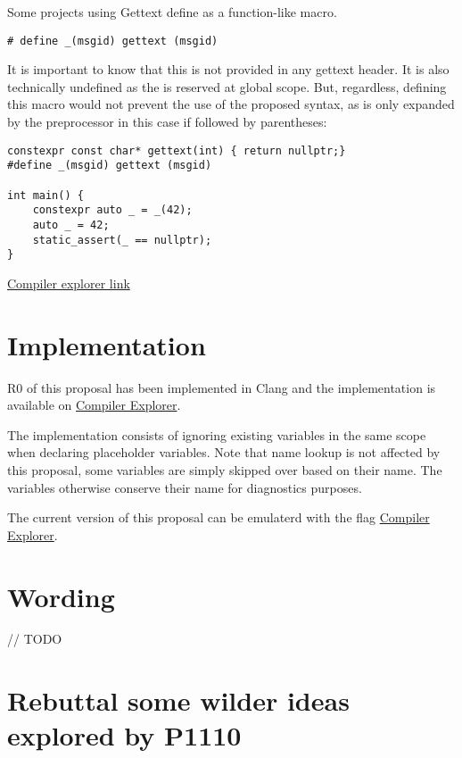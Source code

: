 \documentclass{wg21}
\begin{document}
{Some projects using Gettext define \tcode{_} as a function-like macro.

\begin{lstlisting}[style=color]
# define _(msgid) gettext (msgid)
\end{lstlisting}

It is important to know that this is not provided in any gettext header.
It is also technically undefined as the \tcode{_} is reserved at global scope.
But, regardless, defining this macro would not prevent the use of the proposed syntax, as \tcode{_} is only
expanded by the preprocessor in this case if followed by parentheses:

\begin{lstlisting}[style=color]
constexpr const char* gettext(int) { return nullptr;} 
#define _(msgid) gettext (msgid)

int main() {
    constexpr auto _ = _(42);
    auto _ = 42;
    static_assert(_ == nullptr);
}

\end{lstlisting}

\href{https://godbolt.org/z/FRFg9-}{Compiler explorer link}

\section{Implementation}

R0 of this proposal has been implemented in Clang and the implementation is available on \href{https://godbolt.org/z/5lmnfN}{Compiler Explorer}.

The implementation consists of ignoring existing \tcode{_} variables in the same scope when declaring placeholder variables.
Note that name lookup is not affected by this proposal, some variables are simply skipped over based on their name.
The variables otherwise conserve their name for diagnostics purposes.

The current version of this proposal can be emulaterd with the  flag \href{https://godbolt.org/z/_C6X7L}{Compiler Explorer}.


\section{Wording}

// TODO

\section{Rebuttal some wilder ideas explored by P1110}

}
\end{document}
